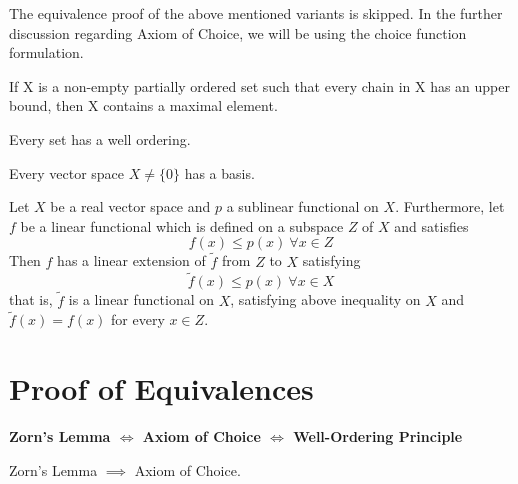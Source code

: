\documentclass[11pt,a4paper]{article}
\begin{document}
\begin{note}
    The equivalence proof of the above mentioned variants is skipped. In the further discussion regarding Axiom of Choice, we will be using the choice function formulation.
\end{note}

\begin{zl}
    If X is a non-empty partially ordered set such that every chain in X has an upper bound, then X contains a maximal element.
\end{zl}

\begin{wop}
 Every set has a well ordering.
\end{wop}

\begin{ehb}
    Every vector space $X\neq \{0\}$ has a basis.
\end{ehb}

\begin{hbt}
 Let $X$ be a real vector space and $p$ a sublinear functional on $X$. Furthermore, let $f$ be a linear functional which is defined on a subspace $Z$ of $X$ and satisfies 
 \begin{equation*}
     f(x) \leq p(x)\ \forall x \in Z
 \end{equation*}
 Then $f$ has a linear extension of $\tilde{f}$ from $Z$ to $X$ satisfying
 \begin{equation*}
     \tilde{f}(x) \leq p(x)\ \forall x \in X 
 \end{equation*}
 that is, $\tilde{f}$ is a linear functional on $X$, satisfying above inequality on $X$ and $\tilde{f}(x) = f(x)$ for every $x \in Z$.
\end{hbt}

\section{Proof of Equivalences}

\textbf{Zorn's Lemma $\iff$ Axiom of Choice $\iff$ Well-Ordering Principle}

\begin{theorem}\label{thm:zl_ac}
    Zorn's Lemma $\implies$ Axiom of Choice.
\end{theorem}
\end{document}

